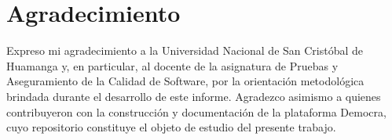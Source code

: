 \chapter*{Agradecimiento}
Expreso mi agradecimiento a la Universidad Nacional de San Crist\'obal de Huamanga y, en particular,
al docente de la asignatura de Pruebas y Aseguramiento de la Calidad de Software, por la orientaci\'on
metodol\'ogica brindada durante el desarrollo de este informe. Agradezco asimismo a quienes
contribuyeron con la construcci\'on y documentaci\'on de la plataforma Democra, cuyo repositorio
constituye el objeto de estudio del presente trabajo.
